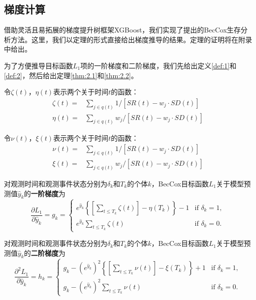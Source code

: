 \subsection{梯度计算}

借助灵活且易拓展的梯度提升树框架XGBoost，我们实现了提出的BecCox生存分析方法。这里，我们以定理的形式直接给出梯度推导的结果。定理的证明将在附录中给出。
    
为了方便推导目标函数$L_1$项的一阶梯度和二阶梯度，我们先给出定义\ref{def:1}和\ref{def:2}，然后给出定理\ref{thm:2.1}和\ref{thm:2.2}。

\begin{definition}\label{def:1}
令$\zeta(t)$，$\eta(t)$表示两个关于时间$t$的函数：\[
\begin{split}
\zeta(t) =& \sum_{j\in q(t)} 1/[SR(t) - w_j\cdot SD(t)] \\
\eta(t)  =& \sum_{j\in q(t)} w_j/[SR(t) - w_j\cdot SD(t)]
\end{split}
\]
\end{definition}

\begin{definition}\label{def:2}
令$\nu(t)$，$\xi(t)$表示两个关于时间$t$的函数：\[
\begin{split}
\nu(t) =& \sum_{j\in q(t)} 1/[SR(t) - w_j\cdot SD(t)] \\
\xi(t)  =& \sum_{j\in q(t)} w_j/[SR(t) - w_j\cdot SD(t)]
\end{split}
\]
\end{definition}

\begin{theorem}\label{thm:2.1}
对观测时间和观测事件状态分别为$\delta_k$和$T_k$的个体$k$，BecCox目标函数$L_1$关于模型预测值$\hat{y}_k$的\textbf{一阶梯度}为$$
\frac{\partial L_1}{\partial \hat{y}_k} = g_k = 
\begin{cases}
e^{\hat{y}_k} \left\{ \left[\sum_{t\le T_k} \zeta(t)\right] - \eta(T_k) \right\} - 1 & \text{if } \delta_k = 1,\\
e^{\hat{y}_k} \sum_{t\le T_k} \zeta(t) & \text{if } \delta_k = 0.
\end{cases}
$$
\end{theorem}

\begin{theorem}\label{thm:2.2}
对观测时间和观测事件状态分别为$\delta_k$和$T_k$的个体$k$，BecCox目标函数$L_1$关于模型预测值$\hat{y}_k$的\textbf{二阶梯度}为$$
\frac{\partial^2 L_1}{\partial \hat{y}_k} = h_k = 
\begin{cases}
g_k - (e^{\hat{y}_k})^2 \left\{ \left[\sum_{t\le T_k} \nu(t)\right] - \xi(T_k) \right\} + 1 & \text{if } \delta_k = 1,\\
g_k - (e^{\hat{y}_k})^2 \sum_{t\le T_k} \nu(t) & \text{if } \delta_k = 0.
\end{cases}
$$
\end{theorem}

